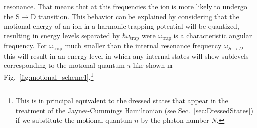 resonance. That means that at this frequencies the ion is more likely to
undergo the S$\rightarrow$D transition. This behavior can be explained by
considering that the motional energy of an ion in a harmonic trapping potential
will be quantized, resulting in energy levels separated by
$\hbar\omega_{\text{trap}}$ were $\omega_{\text{trap}}$ is a characteristic
angular frequency. For $\omega_\text{trap}$ much smaller than the internal
resonance frequency $\omega_{S\rightarrow D}$ this will result in an energy level
in which any internal states will show sublevels corresponding to the motional
quantum $n$ like shown in Fig.~\ref{fig:motional_scheme1}.\footnote{This is in
  principal equivalent to the dressed states that appear in the treatment of the
  Jaynes-Cummings Hamiltonian (see Sec.~\ref{sec:DressedStates}) if we substitute the motional quantum $n$ by
the photon number $N$.}

